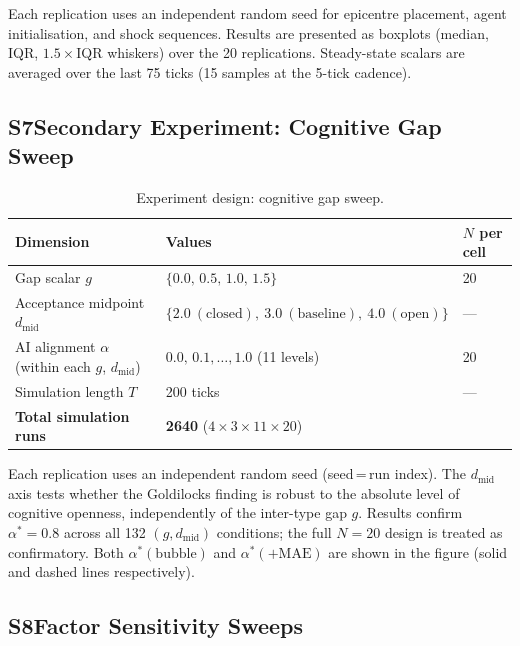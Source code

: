 Each replication uses an independent random seed for epicentre placement, agent
initialisation, and shock sequences.
Results are presented as boxplots (median, IQR, $1.5\times$IQR whiskers) over the
20 replications.
Steady-state scalars are averaged over the last 75 ticks (15 samples at the
5-tick cadence).

\subsection*{S7\quad Secondary Experiment: Cognitive Gap Sweep}

\begin{table}[h]
\centering
\caption{Experiment design: cognitive gap sweep.}
\label{tab:S7}
\begin{tabular}{lll}
\toprule
Dimension & Values & $N$ per cell \\
\midrule
Gap scalar $g$               & $\{0.0,\,0.5,\,1.0,\,1.5\}$                   & 20 \\
Acceptance midpoint $d_{\mathrm{mid}}$ & $\{2.0\ (\text{closed}),\ 3.0\ (\text{baseline}),\ 4.0\ (\text{open})\}$ & --- \\
AI alignment $\alpha$ (within each $g$, $d_{\mathrm{mid}}$)
                             & $0.0,\,0.1,\ldots,1.0$ (11 levels)             & 20 \\
Simulation length $T$        & 200 ticks                                       & --- \\
\midrule
\textbf{Total simulation runs} & \multicolumn{2}{l}{\textbf{2640} ($4\times3\times11\times20$)} \\
\bottomrule
\end{tabular}
\end{table}

Each replication uses an independent random seed (seed\,=\,run index).
The $d_{\mathrm{mid}}$ axis tests whether the Goldilocks finding is robust to
the absolute level of cognitive openness, independently of the inter-type gap $g$.
Results confirm $\alpha^*=0.8$ across all 132 $(g,d_{\mathrm{mid}})$ conditions;
the full $N=20$ design is treated as confirmatory.
Both $\alpha^*(\text{bubble})$ and $\alpha^*(+\mathrm{MAE})$ are shown in the
figure (solid and dashed lines respectively).

\subsection*{S8\quad Factor Sensitivity Sweeps}

